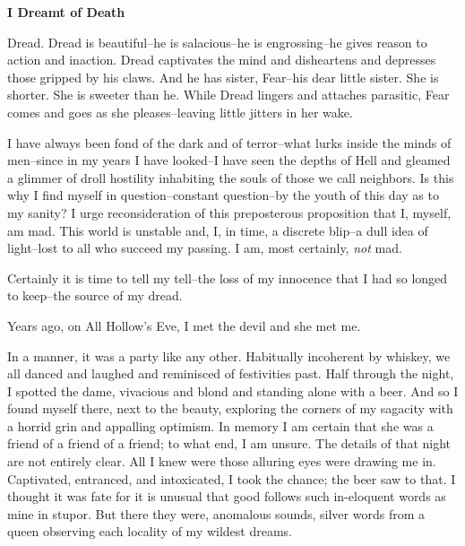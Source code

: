 \documentclass{article}
\begin{document}


\begin{center}
\large\textbf{I Dreamt of Death}
\end{center}



\noindent
Dread.
Dread is beautiful--he is salacious--he is engrossing--he
gives reason to action and inaction.
Dread captivates the mind and disheartens and depresses
those gripped by his claws.
And he has sister, Fear--his dear little sister.
She is shorter.  She is sweeter than he.
While Dread lingers and attaches parasitic,
Fear comes and goes as she pleases--leaving
little jitters in her wake.


I have always been fond of the dark and of terror--what
lurks inside the minds of men--since in my years
I have looked--I have seen the depths of Hell
and gleamed a glimmer of droll hostility
inhabiting the souls of those we call neighbors.
Is this why I find myself in question--constant question--by
the youth of this day as to my sanity?
I urge reconsideration of this preposterous proposition that
I, myself, am mad.
This world is unstable and, I, in time, a discrete blip--a
dull idea of light--lost to all who succeed my passing.
I am, most certainly, \textit{not} mad.
\VV


\noindent %
Certainly it is time to tell my tell--the
loss of my innocence that I had so longed to keep--the
source of my dread.
\VV


\noindent
Years ago, on All Hollow's Eve,
I met the devil and she met me.
\VV


\noindent
In a manner, it was a party like any other.
Habitually incoherent by whiskey,
we all danced and laughed and reminisced of festivities past.
Half through the night, I spotted the dame,
vivacious and blond and standing alone with a beer.
And so I found myself there, next to the beauty,
exploring the corners of my sagacity with a horrid
grin and appalling optimism.
In memory I am certain that she was a friend of
a friend of a friend; to what end, I am unsure.
The details of that night are not entirely clear.
All I knew were those alluring eyes were drawing me in.
Captivated, entranced, and intoxicated,
I took the chance; the beer saw to that.
I thought it was fate for it is unusual
that good follows such in-eloquent words
as mine in stupor.
But there they were, anomalous sounds,
silver words from a queen observing each
locality of my wildest dreams.
\end{document}

